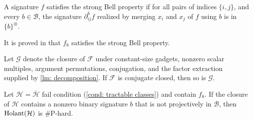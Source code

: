 \begin{definition}\label{def-strong-bell}
    A signature $f$ satisfies the strong Bell property if for all pairs of indices $\{i, j\}$, and every $b\in \mathcal{B}$, the signature $\partial_{ij}^b f$  realized by merging $x_i$ and $x_j$ of $f$ using $b$ is in $\{b\}^{\otimes}.$
\end{definition}

It is proved in \cite{realholant} that $f_8$ satisfies the strong Bell property.

Let $\mathcal G$ denote the closure of $\mathcal{F}$ under constant-size
gadgets, nonzero scalar multiples, argument permutations, conjugation, and
the factor extraction supplied by \cref{lm: decomposition}.  
If $\mathcal{F}$ is conjugate closed, then so is $\mathcal G$.

\begin{lemma}
\label{lm: f8 complex non Bell}
Let $\mathcal H=\overline{\mathcal H}$ fail condition
\rm{(\ref{cond: tractable classes})} and contain $f_8$.  If the closure of
$\mathcal H$ contains a nonzero binary signature $b$ that is not
projectively in $\mathcal B$, then $\operatorname{Holant}(\mathcal H)$ is \#P-hard.
\end{lemma}

